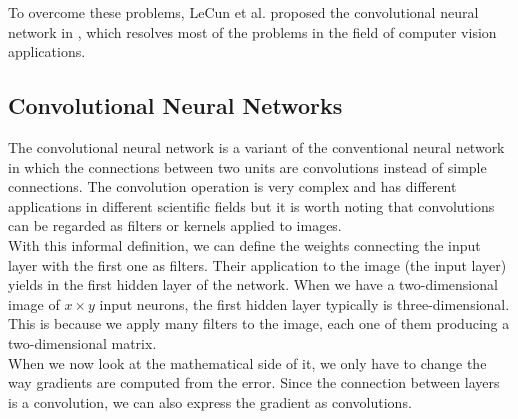 \documentclass[11pt,a4paper]{article}
\begin{document}
To overcome these problems, LeCun et al. proposed the convolutional neural network in \cite{cnnOriginal}, which resolves most of the problems in the field of computer vision applications.

\subsection{Convolutional Neural Networks}
The convolutional neural network is a variant of the conventional neural network in which the connections between two units are convolutions instead of simple connections. The convolution operation is very complex and has different applications in different scientific fields but it is worth noting that convolutions can be regarded as filters or kernels applied to images.\\
With this informal definition, we can define the weights connecting the input layer with the first one as filters. Their application to the image (the input layer) yields in the first hidden layer of the network. When we have a two-dimensional image of $x \times y$ input neurons, the first hidden layer typically is three-dimensional. This is because we apply many filters to the image, each one of them producing a two-dimensional matrix.\\
When we now look at the mathematical side of it, we only have to change the way gradients are computed from the error. Since the connection between layers is a convolution, we can also express the gradient as convolutions.
\end{document}
